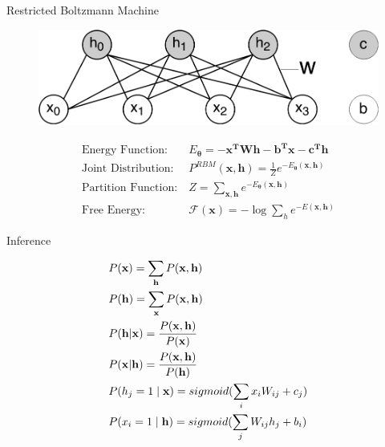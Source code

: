 	\begin{frame}{Restricted Boltzmann Machine}
	    \begin{figure}[t]
	    \includegraphics[width=0.5\linewidth]{RBMStruct.png}
	    \end{figure}
	    \begin{minipage}{0.48\linewidth}
	    \begin{align}
	      \text{Energy Function:}~&E_{\boldsymbol{\theta}} = -\mathbf{x^{T}}\mathbf{W}\mathbf{h}-\mathbf{b^{T}}\mathbf{x}-\mathbf{c^{T}}\mathbf{h}\nonumber\\
	    \text{Joint Distribution:}~&P^{RBM} (\mathbf{x},\mathbf{h}) = \frac{1}{Z} e^{-E_{\boldsymbol{\theta}}(\mathbf{x},\mathbf{h})}\nonumber\\
	     \text{Partition Function:}~ &Z = \sum_{\mathbf{x,h}} e^{-E_{\boldsymbol{\theta}}(\mathbf{x},\mathbf{h})}\nonumber\\
	     \text{Free Energy:}~& \mathcal{F}(\mathbf{x}) = - \log \sum_h e^{-E(\mathbf{x,h})}\nonumber
	    \end{align}
	    \end{minipage}
	    
	\end{frame}
	\begin{frame}[t]{Inference}
		\begin{minipage}[t]{0.48\linewidth}
			 \begin{eqnarray}
			 &P(\mathbf{x}) = \sum_{\mathbf{h}} P(\mathbf{x,h})\nonumber\\
			 &P (\mathbf{h}) = \sum_{\mathbf{x}} P(\mathbf{x,h})\nonumber\\
			 &P (\mathbf{h}|\mathbf{x})= \frac{P(\mathbf{x},\mathbf{h})}{P(\mathbf{x})}\nonumber\\
			 &P(\mathbf{x}|\mathbf{h})= \frac{P(\mathbf{x},\mathbf{h})}{P(\mathbf{h})}\nonumber\\
			 &P(h_{j}=1 \mid \mathbf{x})= sigmoid(\sum_{i} x_{i}W_{ij} + c_{j})\nonumber\\
			 &P(x_{i}=1 \mid \mathbf{h}) = sigmoid(\sum_{j} W_{ij} h_{j} + b_{i})\nonumber
			 \end{eqnarray}
	\end{minipage}

	\vspace{5mm}
	 
	\end{frame}
